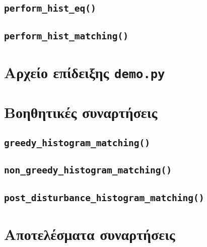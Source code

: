 \documentclass{article}
\begin{document}
\subsection{\texttt{perform\_hist\_eq()}}
\subsection{\texttt{perform\_hist\_matching()}}
\section{Αρχείο επίδειξης \texttt{demo.py}}
\section{Βοηθητικές συναρτήσεις}
\subsection{\texttt{greedy\_histogram\_matching()}}\label{helpfunc-greedy}
\subsection{\texttt{non\_greedy\_histogram\_matching()}}\label{helpfunc-nongreedy}
\subsection{\texttt{post\_disturbance\_histogram\_matching()}}\label{helpfunc-post}
\section{Αποτελέσματα συναρτήσεις}
\end{document}
